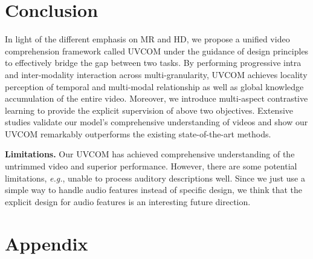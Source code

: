 \documentclass[10pt,twocolumn,letterpaper]{article}
\begin{document}
\section{Conclusion}
In light of the different emphasis on MR and HD, we propose a unified video comprehension framework called UVCOM under the guidance of design principles to effectively bridge the gap between two tasks.
By performing progressive intra and inter-modality interaction across multi-granularity, UVCOM achieves locality perception of temporal and multi-modal relationship as well as global knowledge accumulation of the entire video.
Moreover, we introduce multi-aspect contrastive learning to provide the explicit supervision of above two objectives. 
Extensive studies validate our model’s comprehensive understanding of videos and show our UVCOM remarkably outperforms the existing state-of-the-art methods.

\noindent \textbf{Limitations.} Our UVCOM has achieved comprehensive understanding of the untrimmed video and superior performance.
However, there are some potential limitations, \textit{e.g.}, unable to process auditory descriptions well.
Since we just use a simple way to handle audio features instead of specific design, we think that the explicit design for audio features is an interesting future direction.

 {
    \small
    
    
}
\clearpage
\setcounter{page}{1}
\appendix
\section*{\large Appendix}
\end{document}
